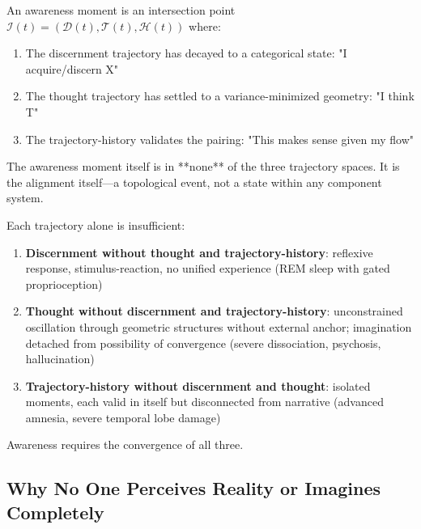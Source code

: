 \begin{definition}
\label{def:awareness-point}
An awareness moment is an intersection point $\mathcal{I}(t) = (\mathcal{D}(t), \mathcal{T}(t), \mathcal{H}(t))$ where:

\begin{enumerate}[label=(\roman*),leftmargin=*]
\item The discernment trajectory has decayed to a categorical state: "I acquire/discern X"
\item The thought trajectory has settled to a variance-minimized geometry: "I think T"
\item The trajectory-history validates the pairing: "This makes sense given my flow"
\end{enumerate}

The awareness moment itself is in **none** of the three trajectory spaces. It is the alignment itself—a topological event, not a state within any component system.
\end{definition}

\begin{principle}
\label{prin:three-required}
Each trajectory alone is insufficient:

\begin{enumerate}[label=(\arabic*),leftmargin=*]
\item \textbf{Discernment without thought and trajectory-history}: reflexive response, stimulus-reaction, no unified experience (REM sleep with gated proprioception)

\item \textbf{Thought without discernment and trajectory-history}: unconstrained oscillation through geometric structures without external anchor; imagination detached from possibility of convergence (severe dissociation, psychosis, hallucination)

\item \textbf{Trajectory-history without discernment and thought}: isolated moments, each valid in itself but disconnected from narrative (advanced amnesia, severe temporal lobe damage)
\end{enumerate}
Awareness requires the convergence of all three.
\end{principle}

\subsection{Why No One Perceives Reality or Imagines Completely}


